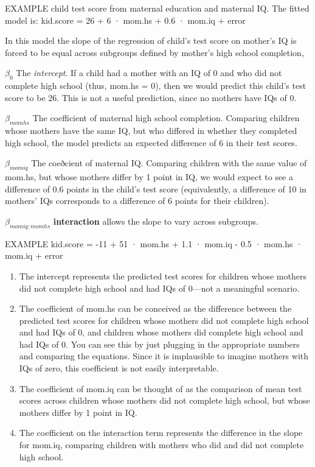\documentclass[
]{article}
\begin{document}
EXAMPLE child test score from maternal education and maternal IQ. The
fitted model is: kid.score = 26 + 6 · mom.hs + 0.6 · mom.iq + error

In this model the slope of the regression of child's test score on
mother's IQ is forced to be equal across subgroups defined by mother's
high school completion,

\(\beta_0\) The \emph{intercept}. If a child had a mother with an IQ of
0 and who did not complete high school (thus, mom.hs = 0), then we would
predict this child's test score to be 26. This is not a useful
prediction, since no mothers have IQs of 0.

\(\beta_{momhs}\) The coefficient of maternal high school completion.
Comparing children whose mothers have the same IQ, but who differed in
whether they completed high school, the model predicts an expected
difference of 6 in their test scores.

\(\beta_{momiq}\) The coeðcient of maternal IQ. Comparing children with
the same value of mom.hs, but whose mothers differ by 1 point in IQ, we
would expect to see a difference of 0.6 points in the child's test score
(equivalently, a difference of 10 in mothers' IQs corresponds to a
difference of 6 points for their children).

\(\beta_{momiq:momhs}\) \textbf{interaction} allows the slope to vary
across subgroups.

EXAMPLE kid.score = -11 + 51 · mom.hs + 1.1 · mom.iq - 0.5 · mom.hs ·
mom.iq + error

\begin{enumerate}
\def\labelenumi{\arabic{enumi}.}
\item
  The intercept represents the predicted test scores for children whose
  mothers did not complete high school and had IQs of 0---not a
  meaningful scenario.
\item
  The coefficient of mom.hs can be conceived as the difference between
  the predicted test scores for children whose mothers did not complete
  high school and had IQs of 0, and children whose mothers did complete
  high school and had IQs of 0. You can see this by just plugging in the
  appropriate numbers and comparing the equations. Since it is
  implausible to imagine mothers with IQs of zero, this coefficient is
  not easily interpretable.
\item
  The coefficient of mom.iq can be thought of as the comparison of mean
  test scores across children whose mothers did not complete high
  school, but whose mothers differ by 1 point in IQ.
\item
  The coefficient on the interaction term represents the difference in
  the slope for mom.iq, comparing children with mothers who did and did
  not complete high school.
\end{enumerate}
\end{document}
